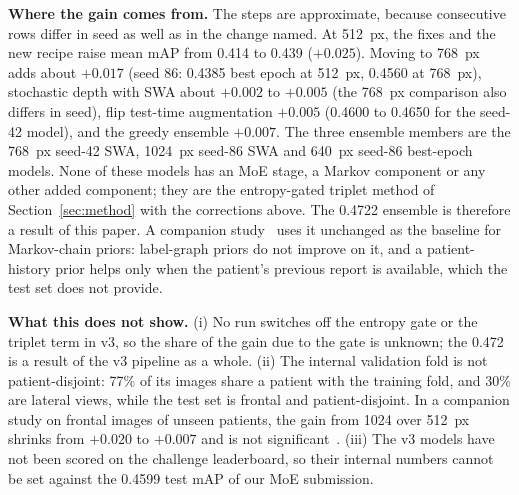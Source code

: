 \documentclass[conference]{IEEEtran}
\begin{document}
\textbf{Where the gain comes from.} The steps are approximate, because consecutive rows differ in seed as well as in the change named. At 512~px, the fixes and the new recipe raise mean mAP from 0.414 to 0.439 ($+0.025$). Moving to 768~px adds about $+0.017$ (seed 86: 0.4385 best epoch at 512~px, 0.4560 at 768~px), stochastic depth with SWA about $+0.002$ to $+0.005$ (the 768~px comparison also differs in seed), flip test-time augmentation $+0.005$ (0.4600 to 0.4650 for the seed-42 model), and the greedy ensemble $+0.007$. The three ensemble members are the 768~px seed-42 SWA, 1024~px seed-86 SWA and 640~px seed-86 best-epoch models. None of these models has an MoE stage, a Markov component or any other added component; they are the entropy-gated triplet method of Section~\ref{sec:method} with the corrections above. The 0.4722 ensemble is therefore a result of this paper. A companion study~\cite{b25} uses it unchanged as the baseline for Markov-chain priors: label-graph priors do not improve on it, and a patient-history prior helps only when the patient's previous report is available, which the test set does not provide.

\textbf{What this does not show.} (i) No run switches off the entropy gate or the triplet term in v3, so the share of the gain due to the gate is unknown; the 0.472 is a result of the v3 pipeline as a whole. (ii) The internal validation fold is not patient-disjoint: 77\% of its images share a patient with the training fold, and 30\% are lateral views, while the test set is frontal and patient-disjoint. In a companion study on frontal images of unseen patients, the gain from 1024 over 512~px shrinks from $+0.020$ to $+0.007$ and is not significant~\cite{b25}. (iii) The v3 models have not been scored on the challenge leaderboard, so their internal numbers cannot be set against the 0.4599 test mAP of our MoE submission.
\end{document}
